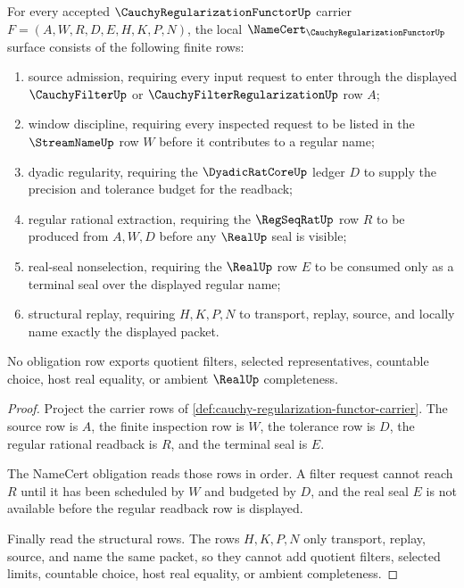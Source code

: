 \begin{theorem}
\label{thm:cauchy-regularization-functor-obligation-surface}
For every accepted $\CauchyRegularizationFunctorUp$ carrier $F=(A,W,R,D,E,H,K,P,N)$, the local $\NameCert_{\CauchyRegularizationFunctorUp}$ surface consists of the following finite rows:
\begin{enumerate}
\item source admission, requiring every input request to enter through the displayed $\CauchyFilterUp$ or $\CauchyFilterRegularizationUp$ row $A$;
\item window discipline, requiring every inspected request to be listed in the $\StreamNameUp$ row $W$ before it contributes to a regular name;
\item dyadic regularity, requiring the $\DyadicRatCoreUp$ ledger $D$ to supply the precision and tolerance budget for the readback;
\item regular rational extraction, requiring the $\RegSeqRatUp$ row $R$ to be produced from $A,W,D$ before any $\RealUp$ seal is visible;
\item real-seal nonselection, requiring the $\RealUp$ row $E$ to be consumed only as a terminal seal over the displayed regular name;
\item structural replay, requiring $H,K,P,N$ to transport, replay, source, and locally name exactly the displayed packet.
\end{enumerate}
No obligation row exports quotient filters, selected representatives, countable choice, host real equality, or ambient $\RealUp$ completeness.
\end{theorem}
\begin{proof}
Project the carrier rows of \autoref{def:cauchy-regularization-functor-carrier}. The source row is $A$, the finite inspection row is $W$, the tolerance row is $D$, the regular rational readback is $R$, and the terminal seal is $E$.

The NameCert obligation reads those rows in order. A filter request cannot reach $R$ until it has been scheduled by $W$ and budgeted by $D$, and the real seal $E$ is not available before the regular readback row is displayed.

Finally read the structural rows. The rows $H,K,P,N$ only transport, replay, source, and name the same packet, so they cannot add quotient filters, selected limits, countable choice, host real equality, or ambient completeness.
\end{proof}

